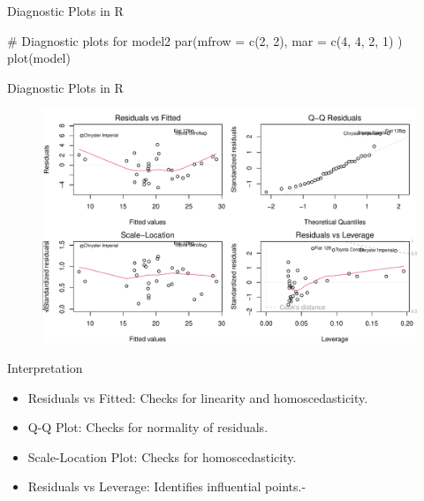 \documentclass[
  18 pt,
  ignorenonframetext,
  aspectratio=1610,
]{beamer}
\newenvironment{Shaded}{\begin{snugshade}}{\end{snugshade}}
\newcommand{\AttributeTok}[1]{\textcolor[rgb]{0.40,0.45,0.13}{#1}}
\newcommand{\CommentTok}[1]{\textcolor[rgb]{0.37,0.37,0.37}{#1}}
\newcommand{\DecValTok}[1]{\textcolor[rgb]{0.68,0.00,0.00}{#1}}
\newcommand{\FunctionTok}[1]{\textcolor[rgb]{0.28,0.35,0.67}{#1}}
\newcommand{\NormalTok}[1]{\textcolor[rgb]{0.00,0.23,0.31}{#1}}
\providecommand{\tightlist}{%
  \setlength{\itemsep}{0pt}\setlength{\parskip}{0pt}}\usepackage{longtable,booktabs,array}
\begin{document}
\begin{frame}[fragile]{Diagnostic Plots in R}
\protect\hypertarget{diagnostic-plots-in-r}{}
\begin{Shaded}
\begin{Highlighting}[]
\CommentTok{\# Diagnostic plots for model2}
\FunctionTok{par}\NormalTok{(}\AttributeTok{mfrow =} \FunctionTok{c}\NormalTok{(}\DecValTok{2}\NormalTok{, }\DecValTok{2}\NormalTok{), }\AttributeTok{mar =} \FunctionTok{c}\NormalTok{(}\DecValTok{4}\NormalTok{, }\DecValTok{4}\NormalTok{, }\DecValTok{2}\NormalTok{, }\DecValTok{1}\NormalTok{) )}
\FunctionTok{plot}\NormalTok{(model)}
\end{Highlighting}
\end{Shaded}
\end{frame}

\begin{frame}{Diagnostic Plots in R}
\protect\hypertarget{diagnostic-plots-in-r-1}{}
\begin{figure}

{\centering \includegraphics[width=\textwidth,height=0.6\textheight]{R-Regression_files/figure-beamer/unnamed-chunk-17-1.pdf}

}

\end{figure}
\end{frame}

\begin{frame}{Interpretation}
\protect\hypertarget{interpretation-2}{}
\begin{itemize}
\tightlist
\item
  Residuals vs Fitted: Checks for linearity and homoscedasticity.
\item
  Q-Q Plot: Checks for normality of residuals.
\item
  Scale-Location Plot: Checks for homoscedasticity.
\item
  Residuals vs Leverage: Identifies influential points.-
\end{itemize}
\end{frame}
\end{document}
